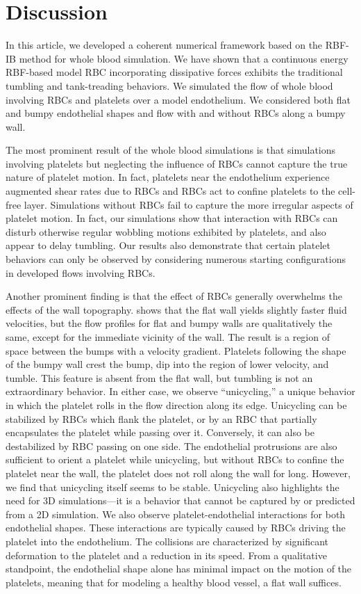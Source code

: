 \section{Discussion}\label{sec:conclusion}

In this article, we developed a coherent numerical framework based on the RBF-IB method for whole blood
simulation. We have shown that a continuous energy RBF-based model RBC incorporating dissipative forces exhibits
the traditional tumbling and tank-treading behaviors. We simulated the flow of whole blood involving RBCs and
platelets over a model endothelium. We considered both flat and bumpy endothelial shapes and flow with and without
RBCs along a bumpy wall.

The most prominent result of the whole blood simulations is that simulations involving platelets but neglecting
the influence of RBCs cannot capture the true nature of platelet motion. In fact, platelets near the endothelium
experience augmented shear rates due to RBCs and RBCs act to confine platelets to the cell-free layer. Simulations
without RBCs fail to capture the more irregular aspects of platelet motion. In fact, our simulations show that
interaction with RBCs can disturb otherwise regular wobbling motions exhibited by platelets, and also appear to
delay tumbling. Our results also demonstrate that certain platelet behaviors can only be observed by considering
numerous starting configurations in developed flows involving RBCs.

Another prominent finding is that the effect of RBCs generally overwhelms the effects of the wall topography.
 shows that the flat wall yields slightly faster fluid velocities, but the flow profiles
for flat and bumpy walls are qualitatively the same, except for the immediate vicinity of the wall. The result is
a region of space between the bumps with a velocity gradient. Platelets following the shape of the bumpy wall
crest the bump, dip into the region of lower velocity, and tumble. This feature is absent from the flat wall, but
tumbling is not an extraordinary behavior. In either case, we observe ``unicycling\qend,'' a unique behavior in
which the platelet rolls in the flow direction along its edge. Unicycling can be stabilized by RBCs which flank
the platelet, or by an RBC that partially encapsulates the platelet while passing over it. Conversely, it can also
be destabilized by RBC passing on one side. The endothelial protrusions are also sufficient to orient a platelet
while unicycling, but without RBCs to confine the platelet near the wall, the platelet does not roll along the
wall for long. However, we find that unicycling itself seems to be stable. Unicycling also highlights the need for
3D simulations---it is a behavior that cannot be captured by or predicted from a 2D simulation. We also observe
platelet-endothelial interactions for both endothelial shapes. These interactions are typically caused by RBCs
driving the platelet into the endothelium. The collisions are characterized by significant deformation to the
platelet and a reduction in its speed. From a qualitative standpoint, the endothelial shape alone has minimal
impact on the motion of the platelets, meaning that for modeling a healthy blood vessel, a flat wall suffices.


